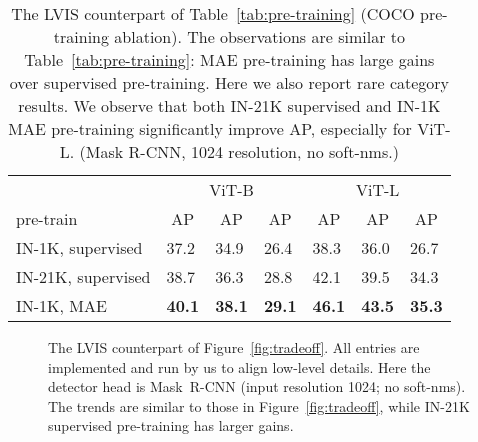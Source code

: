 \documentclass[runningheads]{llncs}
\newcommand{\boxAP}{AP\xspace}
\newcommand{\maskAP}{AP\xspace}
\newcommand{\maskAPrare}{AP\xspace}
\begin{document}
\begin{table}[t]
    \begin{tabular}{@{}l|lll|lll@{}}
     & \multicolumn{3}{c|}{ViT-B} & \multicolumn{3}{c}{ViT-L} \vspace{-.5em} \\
    pre-train & \multicolumn{1}{c}{\scriptsize \boxAP} & \multicolumn{1}{c}{\scriptsize \maskAP} & \multicolumn{1}{c|}{\scriptsize \maskAPrare} & \multicolumn{1}{c}{\scriptsize \boxAP} & \multicolumn{1}{c}{\scriptsize \maskAP} & \multicolumn{1}{c}{\scriptsize \maskAPrare} \\
    \shline
IN-1K, supervised & 37.2 & 34.9 & 26.4 & 38.3 & 36.0 & 26.7 \\
IN-21K, supervised & 38.7 & 36.3 & 28.8 & 42.1 & 39.5 & 34.3 \\ 
IN-1K, MAE & \textbf{40.1} & \textbf{38.1} & \textbf{29.1} & \textbf{46.1} & \textbf{43.5} & \textbf{35.3} \\
    \end{tabular}
    \vspace{.5em}
    \caption{The LVIS counterpart of Table~\ref{tab:pre-training} (COCO pre-training ablation). The observations are similar to Table~\ref{tab:pre-training}: MAE pre-training has large gains over supervised pre-training. Here we also report rare category results. We observe that both IN-21K supervised and IN-1K MAE pre-training significantly improve \maskAPrare, especially for ViT-L. ({Mask R-CNN}, 1024 resolution, no soft-nms.)
    \label{app:tab:pre-training-lvis}
    }
\vspace{-1em}
\end{table}

\begin{figure}[t]
    \newcommand{\sz}{0.295}
    \vspace{-.5em}
    \caption{The LVIS counterpart of Figure~\ref{fig:tradeoff}.
    All entries are implemented and run by us to align low-level details.
    Here the detector head is \mbox{Mask R-CNN} (input resolution 1024; no soft-nms). The trends are similar to those in Figure~\ref{fig:tradeoff}, while IN-21K supervised pre-training has larger gains.
    \label{app:fig:tradeoff}
    }
\end{figure}
\end{document}
